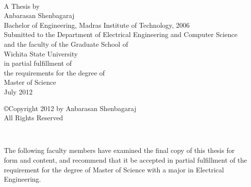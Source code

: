 \documentclass[12pt,letterpaper,english]{article}
\begin{document}
\renewcommand{\refname}{REFERENCES}

\renewcommand{\thepage}{\roman{page}}
\begin{center} \\
\vspace{1.5in}
\doublespacing
A Thesis by\\Anbarasan Shenbagaraj\\Bachelor of Engineering, Madras Institute of Technology, 2006\\
\vspace{1.5in}
\singlespacing Submitted to the Department of Electrical Engineering and Computer Science\\
and the faculty of the Graduate School of\\
Wichita State University\\
in partial fulfillment of\\\setcounter{page}{1}
the requirements for the degree of\\
Master of Science\\
\vspace{2.5in}
July 2012
\end{center}
\thispagestyle{empty}
\doublespacing
\newpage
\vspace*{3in}
\begin{center}
\copyright  Copyright 2012 by Anbarasan Shenbagaraj\\
All Rights Reserved
\end{center}
\thispagestyle{empty}
\newpage
\singlespacing
\begin{center} 
\\
\end{center}
\vspace{0.2in}The following faculty members have examined the final copy of this thesis for form and content, and recommend that it be accepted in partial fulfillment of the requirement for the degree of Master of Science with a major in Electrical Engineering.\\ \\ \\ \\
\end{document}
